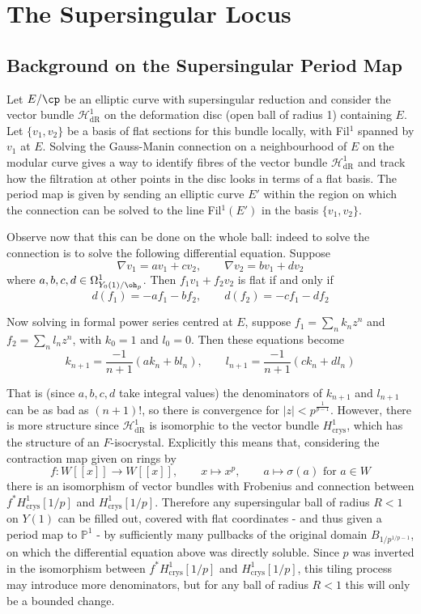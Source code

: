 \documentclass[12pt,letterpaper]{article}
\begin{document}
	
	
	\section{The Supersingular Locus} \label{SecSsing}
	
	
	
	\subsection{Background on the Supersingular Period Map} \label{Period}
	
	Let $E/\cp$ be an elliptic curve with supersingular reduction and consider the vector bundle $\mathcal{H}^1_\text{dR}$ on the deformation disc (open ball of radius 1) containing $E$. Let $\{v_1,v_2\}$ be a basis of flat sections for this bundle locally, with Fil$^1$ spanned by $v_1$ at $E$. Solving the Gauss-Manin connection on a neighbourhood of $E$ on the modular curve gives a way to identify fibres of the vector bundle $\mathcal{H}^1_\text{dR}$ and track how the filtration at other points in the disc looks in terms of a flat basis. The period map is given by sending an elliptic curve $E'$ within the region on which the connection can be solved to the line Fil$^1(E')$ in the basis $\{v_1,v_2\}$. 
		
	Observe now that this can be done on the whole ball: indeed to solve the connection is to solve the following differential equation. Suppose 
	\[\nabla v_1 = av_1+cv_2, \qquad \nabla v_2 = bv_1+dv_2\]
	where $a,b,c,d\in \Omega^1_{Y_0(1)/\oh_p}$. Then $f_1v_1+f_2v_2$ is flat if and only if
	\[d(f_1) = -af_1-bf_2, \qquad d(f_2) = -cf_1-df_2\]
	
	Now solving in formal power series centred at $E$, suppose $f_1 = \sum_n k_nz^n$ and $f_2 = \sum_nl_nz^n$, with $k_0 = 1$ and $l_0 = 0$. Then these equations become 
	\[k_{n+1} = \frac{-1}{n+1} (ak_n+bl_n), \qquad l_{n+1} = \frac{-1}{n+1} (ck_n+dl_n)\]
	
	That is (since $a,b,c,d$ take integral values) the denominators of $k_{n+1}$ and $l_{n+1}$ can be as bad as $(n+1)!$, so there is convergence for $|z|< p^\frac{1}{p-1}$. However, there is more structure since $\mathcal{H}^1_\text{dR}$ is isomorphic to the vector bundle $H^1_\text{crys}$, which has the structure of an $F$-isocrystal. Explicitly this means that, considering the contraction map given on rings by
	\[f\colon W[[x]]\to W[[x]], \qquad x\mapsto x^p, \qquad a\mapsto \sigma(a) \text{ for } a\in W\]	
	there is an isomorphism of vector bundles with Frobenius and connection between $f^*H^1_\text{crys}[1/p]$ and $H^1_\text{crys}[1/p]$. Therefore any supersingular ball of radius $R<1$ on $Y(1)$ can be filled out, covered with flat coordinates - and thus given a period map to $\mathbb{P}^1$ - by sufficiently many pullbacks of the original domain $B_{1/p^{1/p-1}}$, on which the differential equation above was directly soluble. Since $p$ was inverted in the isomorphism between $f^*H^1_\text{crys}[1/p]$ and $H^1_\text{crys}[1/p]$, this tiling process may introduce more denominators, but for any ball of radius $R<1$ this will only be a bounded change.
	
\end{document}
